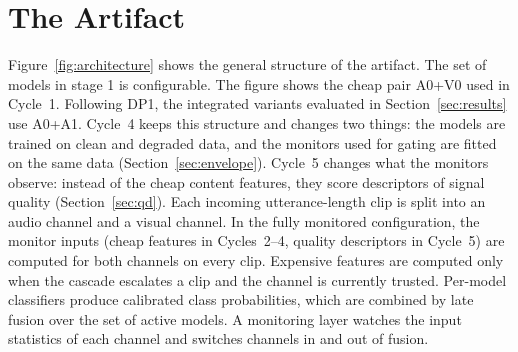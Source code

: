 \section{The Artifact}\label{sec:artifact}

Figure~\ref{fig:architecture} shows the general structure of the artifact. The set of models in stage 1 is configurable. The figure shows the cheap pair A0+V0 used in Cycle~1. Following DP1, the integrated variants evaluated in Section~\ref{sec:results} use A0+A1. Cycle~4 keeps this structure and changes two things: the models are trained on clean and degraded data, and the monitors used for gating are fitted on the same data (Section~\ref{sec:envelope}). Cycle~5 changes what the monitors observe: instead of the cheap content features, they score descriptors of signal quality (Section~\ref{sec:qd}). Each incoming utterance-length clip is split into an audio channel and a visual channel. In the fully monitored configuration, the monitor inputs (cheap features in Cycles~2--4, quality descriptors in Cycle~5) are computed for both channels on every clip. Expensive features are computed only when the cascade escalates a clip and the channel is currently trusted. Per-model classifiers produce calibrated class probabilities, which are combined by late fusion over the set of active models. A monitoring layer watches the input statistics of each channel and switches channels in and out of fusion.

